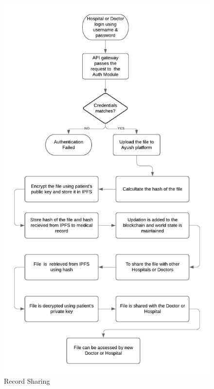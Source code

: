 \documentclass[11pt]{report}
\begin{document}
    \begin{figure}[h!]
        \centering
        \includegraphics[scale=0.8]{F1.png}
        \caption{Record Sharing}
        \label{fig:my_label}
    \end{figure}
\end{document}
